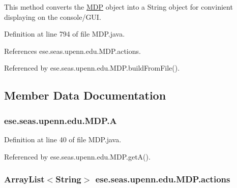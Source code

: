 This method converts the \hyperlink{classese_1_1seas_1_1upenn_1_1edu_1_1_m_d_p}{M\+D\+P} object into a String object for convinient displaying on the console/\+G\+U\+I. 



Definition at line 794 of file M\+D\+P.\+java.



References ese.\+seas.\+upenn.\+edu.\+M\+D\+P.\+actions.



Referenced by ese.\+seas.\+upenn.\+edu.\+M\+D\+P.\+build\+From\+File().



\subsection{Member Data Documentation}
\hypertarget{classese_1_1seas_1_1upenn_1_1edu_1_1_m_d_p_a550a07d803fa2a90eb542b95670fd55b}{}
\subsubsection[{A}]{ ese.\+seas.\+upenn.\+edu.\+M\+D\+P.\+A\hspace{0.3cm}{\ttfamily [private]}}\label{classese_1_1seas_1_1upenn_1_1edu_1_1_m_d_p_a550a07d803fa2a90eb542b95670fd55b}


Definition at line 40 of file M\+D\+P.\+java.



Referenced by ese.\+seas.\+upenn.\+edu.\+M\+D\+P.\+get\+A().

\hypertarget{classese_1_1seas_1_1upenn_1_1edu_1_1_m_d_p_a9035cb3560de616df30a1eb85af72e74}{}
\subsubsection[{actions}]{\setlength{\rightskip}{0pt plus 5cm}Array\+List$<$String$>$ ese.\+seas.\+upenn.\+edu.\+M\+D\+P.\+actions\hspace{0.3cm}{\ttfamily [private]}}\label{classese_1_1seas_1_1upenn_1_1edu_1_1_m_d_p_a9035cb3560de616df30a1eb85af72e74}


